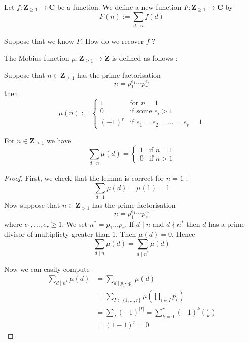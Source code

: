 Let $f:\mathbf{Z}_{\ge 1}\to \mathbf{C}$ be a function. We define a new function $F:\mathbf{Z}_{\ge 1}\to \mathbf{C}$ by 
$$
F(n):= \sum _{d \mid n} f(d)
$$
\begin{question}
Suppose that we know $F$. How do we recover $f$ ?
\end{question}
\begin{definition}
The Mobius function $\mu :\mathbf{Z}_{\ge 1}\to \mathbf{Z}$ is defined as follows :

Suppose that $n\in \mathbf{Z}_{\ge 1}$ has the prime factorisation
$$
n=p_{1}^{e_{1}}\cdots p_{r}^{e_{r}}
$$
then
$$
\mu(n):= \begin{cases}
1 & \text{for }n=1 \\
0 & \text{if some } e_{i}>1 \\
(-1)^{r} & \text{if } e_{1}=e_{2}=\dots=e_{r}=1
\end{cases}
$$
\end{definition}
\begin{lemma}
For $n\in \mathbf{Z}_{\ge 1}$ we have
$$
\sum _{d \mid n}\mu(d)=\begin{cases}
1 & \text{if }n=1 \\
0 & \text{if }n>1
\end{cases}
$$
\end{lemma}
\begin{proof}
First, we check that the lemma is correct for $n=1$ :
$$
\sum _{d \mid 1}\mu(d)=\mu(1)=1
$$
Now suppose that $n\in \mathbf{Z}_{> 1}$ has the prime factorisation
$$
n=p_{1}^{e_{1}}\cdots p_{r}^{e_{r}}
$$
where $e_{1},\dots,e_{r}\ge 1$. We set $n^{*}=p_{1}\dots p_{r}$. If $d\mid n$ and $d \nmid n^{*}$ then $d$ has a prime divisor of multiplicty greater than 1. Then $\mu(d)=0$. Hence 
$$
\sum _{d\mid n}\mu(d)=\sum _{d\mid n^{*}}\mu (d)
$$

Now we can easily compute 
\begin{align*}
\sum _{d\mid n^{*}}\mu(d) & =\sum _{d\mid p_{1}\cdots p_{r}}\mu(d) \\
 & =\sum _{I\subset \{ 1,\dots,r \}} \mu\left( \prod _{i\in I}p_{i} \right) \\
 & =\sum _{I} (-1)^{|I|}=\sum_{k=0}^{r} (-1)^{k}\binom{ r}  {k } \\
 & =(1-1)^{r}=0
\end{align*}
\end{proof}

